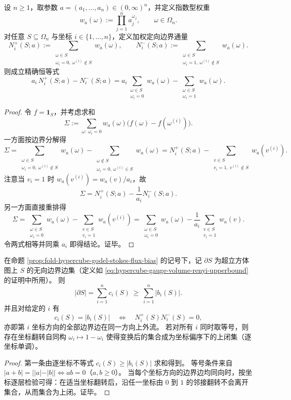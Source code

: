\begin{proposition}\label{prop:fold-hypercube-weighted-discrete-flux-identity}
设 \(n\ge 1\)，取参数 \(a=(a_1,\dots,a_n)\in(0,\infty)^n\)，并定义指数型权重
\[
w_a(\omega):=\prod_{j=1}^n a_j^{\omega_j},
\qquad
\omega\in\Omega_n.
\]
对任意 \(S\subseteq\Omega_n\) 与坐标 \(i\in\{1,\dots,n\}\)，定义加权定向边界通量
\[
N_i^+(S;a):=\sum_{\substack{\omega\in S\\ \omega_i=0,\ \omega^{(i)}\notin S}} w_a(\omega),
\qquad
N_i^-(S;a):=\sum_{\substack{\omega\in S\\ \omega_i=1,\ \omega^{(i)}\notin S}} w_a(\omega).
\]
则成立精确恒等式
\[
a_i\,N_i^+(S;a)-N_i^-(S;a)
=a_i\sum_{\substack{\omega\in S\\ \omega_i=0}}w_a(\omega)-\sum_{\substack{\omega\in S\\ \omega_i=1}}w_a(\omega).
\]
\end{proposition}
\begin{proof}
令 \(f=\mathbf 1_S\)，并考虑求和
\[
\Sigma:=\sum_{\omega:\ \omega_i=0} w_a(\omega)\bigl(f(\omega)-f(\omega^{(i)})\bigr).
\]
一方面按边界分解得
\[
\Sigma
=\sum_{\substack{\omega\in S\\ \omega_i=0,\ \omega^{(i)}\notin S}}w_a(\omega)
-\sum_{\substack{\omega\notin S\\ \omega_i=0,\ \omega^{(i)}\in S}}w_a(\omega)
=N_i^+(S;a)-\sum_{\substack{v\in S\\ v_i=1,\ v^{(i)}\notin S}}w_a(v^{(i)}).
\]
注意当 \(v_i=1\) 时 \(w_a(v^{(i)})=w_a(v)/a_i\)，故
\[
\Sigma=N_i^+(S;a)-\frac{1}{a_i}N_i^-(S;a).
\]
另一方面直接重排得
\[
\Sigma
=\sum_{\substack{\omega\in S\\ \omega_i=0}}w_a(\omega)
-\sum_{\substack{v\in S\\ v_i=1}}w_a(v^{(i)})
=\sum_{\substack{\omega\in S\\ \omega_i=0}}w_a(\omega)
-\frac{1}{a_i}\sum_{\substack{v\in S\\ v_i=1}}w_a(v).
\]
令两式相等并同乘 \(a_i\) 即得结论。证毕。
\end{proof}

\begin{corollary}\label{cor:fold-hypercube-boundary-l1-bias-monotone}
在命题 \ref{prop:fold-hypercube-godel-stokes-flux-bias} 的记号下，记 \(\partial S\) 为超立方体图上 \(S\) 的无向边界边集（定义如 \eqref{eq:hypercube-gauge-volume-renyi-upperbound} 的证明中所用）。
则
\[
|\partial S|=\sum_{i=1}^n c_i(S)\ \ge\ \sum_{i=1}^n |b_i(S)|.
\]
并且对给定的 \(i\) 有
\[
c_i(S)=|b_i(S)|
\quad\Longleftrightarrow\quad
N_i^+(S)N_i^-(S)=0,
\]
亦即第 \(i\) 坐标方向的全部边界边在同一方向上外流。
若对所有 \(i\) 同时取等号，则存在坐标翻转自同构
\(
\omega_i\mapsto 1-\omega_i
\)
使得变换后的集合成为坐标偏序下的上闭集（逐坐标单调）。
\end{corollary}
\begin{proof}
第一条由逐坐标不等式 \(c_i(S)\ge |b_i(S)|\) 求和得到。
等号条件来自 \(|a+b|=||a|-|b||\iff ab=0\)（\(a,b\ge 0\)）。
当每个坐标方向的边界边均同向时，按坐标逐层检验可得：在适当坐标翻转后，沿任一坐标由 \(0\) 到 \(1\) 的邻接翻转不会离开集合，从而集合为上闭。证毕。
\end{proof}

